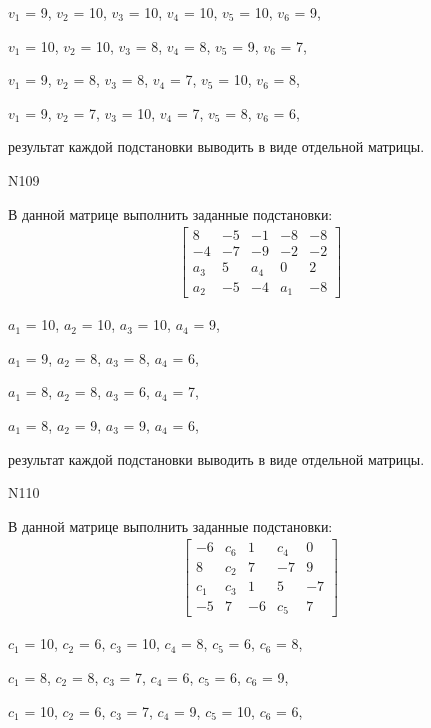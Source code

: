 \documentclass[11pt]{report}
\begin{document}
$v_{1}$ = 9, $v_{2}$ = 10, $v_{3}$ = 10, $v_{4}$ = 10, $v_{5}$ = 10, $v_{6}$ = 9, 

$v_{1}$ = 10, $v_{2}$ = 10, $v_{3}$ = 8, $v_{4}$ = 8, $v_{5}$ = 9, $v_{6}$ = 7, 

$v_{1}$ = 9, $v_{2}$ = 8, $v_{3}$ = 8, $v_{4}$ = 7, $v_{5}$ = 10, $v_{6}$ = 8, 

$v_{1}$ = 9, $v_{2}$ = 7, $v_{3}$ = 10, $v_{4}$ = 7, $v_{5}$ = 8, $v_{6}$ = 6, 

результат каждой подстановки выводить в виде отдельной матрицы.

N109

В данной матрице выполнить заданные подстановки:
\begin{align*}
\left[\begin{matrix}8 & -5 & -1 & -8 & -8\\-4 & -7 & -9 & -2 & -2\\a_{3} & 5 & a_{4} & 0 & 2\\a_{2} & -5 & -4 & a_{1} & -8\end{matrix}\right]
\end{align*}


$a_{1}$ = 10, $a_{2}$ = 10, $a_{3}$ = 10, $a_{4}$ = 9, 

$a_{1}$ = 9, $a_{2}$ = 8, $a_{3}$ = 8, $a_{4}$ = 6, 

$a_{1}$ = 8, $a_{2}$ = 8, $a_{3}$ = 6, $a_{4}$ = 7, 

$a_{1}$ = 8, $a_{2}$ = 9, $a_{3}$ = 9, $a_{4}$ = 6, 

результат каждой подстановки выводить в виде отдельной матрицы.

N110

В данной матрице выполнить заданные подстановки:
\begin{align*}
\left[\begin{matrix}-6 & c_{6} & 1 & c_{4} & 0\\8 & c_{2} & 7 & -7 & 9\\c_{1} & c_{3} & 1 & 5 & -7\\-5 & 7 & -6 & c_{5} & 7\end{matrix}\right]
\end{align*}


$c_{1}$ = 10, $c_{2}$ = 6, $c_{3}$ = 10, $c_{4}$ = 8, $c_{5}$ = 6, $c_{6}$ = 8, 

$c_{1}$ = 8, $c_{2}$ = 8, $c_{3}$ = 7, $c_{4}$ = 6, $c_{5}$ = 6, $c_{6}$ = 9, 

$c_{1}$ = 10, $c_{2}$ = 6, $c_{3}$ = 7, $c_{4}$ = 9, $c_{5}$ = 10, $c_{6}$ = 6, 
\end{document}
